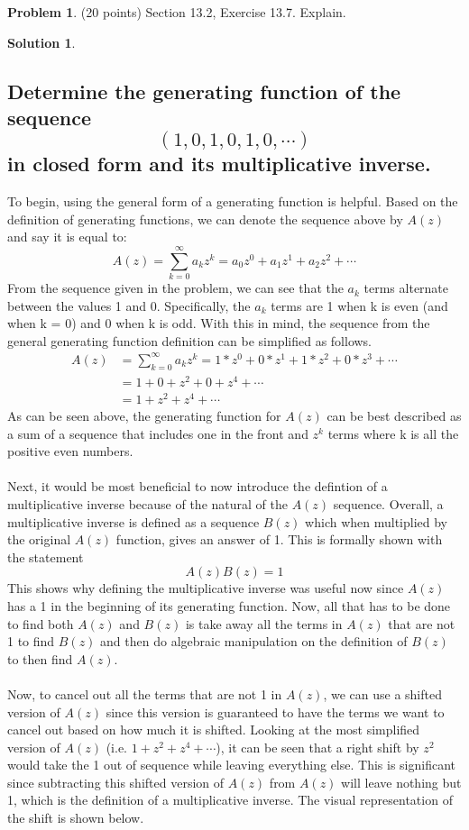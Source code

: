\documentclass{article}
\theoremstyle{definition}
\newtheorem{problem}{Problem}
\newtheorem*{solution}{Solution}
\begin{document}
\newpage
\begin{problem} (20 points) Section 13.2, Exercise 13.7. Explain.
\end{problem}
\begin{solution}
\hspace{1cm}
\subsection*{Determine the generating function of the sequence
$$ (1,0,1,0,1,0,\cdots) $$
in closed form and its multiplicative inverse.}
To begin, using the general form of a generating function is helpful. Based on the definition of generating functions, we can denote the sequence above by $A(z)$ and say it is equal to:
$$ A(z) = \sum_{k=0}^{\infty} a_k z^k = a_0 z^0 + a_1 z^1 + a_2 z^2 + \cdots$$
From the sequence given in the problem, we can see that the $a_k$ terms alternate between the values 1 and 0. Specifically, the $a_k$ terms are 1 when k is even (and when k = 0) and 0 when k is odd. With this in mind, the sequence from the general generating function definition can be simplified as follows.
\begin{align*}
A(z) &= \sum_{k=0}^{\infty} a_k z^k = 1*z^0 + 0 * z^1 + 1*z^2 + 0 * z^3 + \cdots\\
&= 1 + 0 + z^2 + 0 + z^4 + \cdots\\
&= 1 + z^2 + z^4 + \cdots
\end{align*}
As can be seen above, the generating function for $A(z)$ can be best described as a sum of a sequence that includes one in the front and $z^k$ terms where k is all the positive even numbers.\\\\
Next, it would be most beneficial to now introduce the defintion of a multiplicative inverse because of the natural of the $A(z)$ sequence. Overall, a multiplicative inverse is defined as a sequence $B(z)$ which when multiplied by the original $A(z)$ function, gives an answer of 1. This is formally shown with the statement
$$ A(z)B(z) = 1$$
This shows why defining the multiplicative inverse was useful now since $A(z)$ has a 1 in the beginning of its generating function. Now, all that has to be done to find both $A(z)$ and $B(z)$ is take away all the terms in $A(z)$ that are not 1 to find $B(z)$ and then do  algebraic manipulation on the definition of $B(z)$ to then find $A(z)$.\\\\
Now, to cancel out all the terms that are not 1 in $A(z)$, we can use a shifted version of $A(z)$ since this version is guaranteed to have the terms we want to cancel out based on how much it is shifted. Looking at the most simplified version of $A(z)$ (i.e. $1 + z^2 + z^4+ \cdots$), it can be seen that a right shift by $z^2$ would take the 1 out of sequence while leaving everything else. This is significant since subtracting this shifted version of $A(z)$ from $A(z)$ will leave nothing but 1, which is the definition of a multiplicative inverse. The visual representation of the shift is shown below.

\end{solution}
\end{document}
